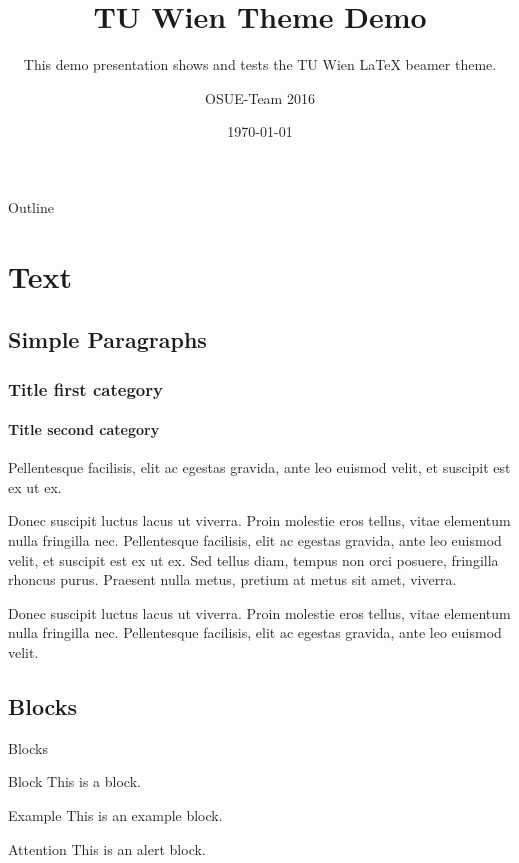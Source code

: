 \documentclass{beamer}
\title[TUW Theme Demo]{%
  TU Wien Theme Demo
}
\subtitle{This demo presentation shows and tests the TU Wien LaTeX beamer theme.}
\author{OSUE-Team 2016}
\date{\today}
\institute[TU Wien]
{%
  Institute of Computer Engineering\\
  TU Wien\\
  -\\
  182.709 Operating Systems UE\\
  WS 2016/17
}
\begin{document}
\begin{frame}
  \titlepage
\end{frame}

\begin{frame}{Outline}
  \tableofcontents
\end{frame}

\section{Text}

\subsection[Paragraphs]{Simple Paragraphs}
\begin{frame}
  \frametitle{Title first category}
  \framesubtitle{Title second category}

  Pellentesque facilisis, elit ac egestas gravida, ante leo euismod velit, et
  suscipit est ex ut ex.

  Donec suscipit luctus lacus ut viverra. Proin molestie eros tellus, vitae
  elementum nulla fringilla nec. Pellentesque facilisis, elit ac egestas
  gravida, ante leo euismod velit, et suscipit est ex ut ex. Sed tellus diam,
  tempus non orci posuere, fringilla rhoncus purus. Praesent nulla metus,
  pretium at metus sit amet, viverra.

  Donec suscipit luctus lacus ut viverra. Proin molestie eros tellus, vitae
  elementum nulla fringilla nec. Pellentesque facilisis, elit ac egestas
  gravida, ante leo euismod velit.
\end{frame}

\subsection{Blocks}
\begin{frame}{Blocks}
  \begin{block}{Block}
    This is a block.
  \end{block}
  \begin{exampleblock}{Example}
    This is an example block.
  \end{exampleblock}
  \begin{alertblock}{Attention}
    This is an alert block.
  \end{alertblock}
\end{frame}
\end{document}
